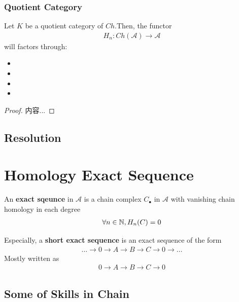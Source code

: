 \documentclass[Total.tex]{subfiles}
\begin{document}
				\subsubsection{Quotient Category}
					\begin{proposition}
						Let $K$ be a quotient category of $Ch$.Then, the functor
						\begin{gather*}
							H_n:Ch(\mathcal{A})\rightarrow \mathcal{A}
						\end{gather*}
						will factors through:
						\begin{itemize}
							\item 
							\item 
							\item 
							\item 
						\end{itemize}
					\end{proposition}
					\begin{proof}
						内容...
					\end{proof}
			\subsection{Resolution}
				
		\section{Homology Exact Sequence}
			\begin{Def}
				An \textbf{exact sqeunce} in $\mathcal{A}$ is a chain complex $C_\bullet$ in $\mathcal{A}$ with vanishing chain homology in each degree
				\begin{gather*}
					\forall n\in \mathbb{N},H_n(C)=0
				\end{gather*}
				
				Especially, a \textbf{short exact sequence} is an exact sequence of the form
				\begin{gather*}
					\dots\rightarrow0\rightarrow A\rightarrow B\rightarrow C\rightarrow 0\rightarrow \dots
				\end{gather*}
				Mostly written as
				\begin{gather*}
					0\rightarrow A\rightarrow B\rightarrow C\rightarrow 0
				\end{gather*}
			\end{Def}
			\subsection{Some of Skills in Chain }
\end{document}
